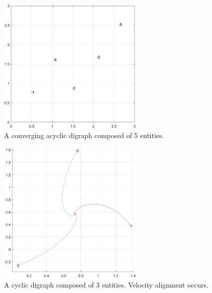 \documentclass[letterpaper, 10 pt, conference]{ieeeconf}  %
\begin{document}
\begin{figure}[thb]
    \begin{center}
    \includegraphics[width=7cm]{IMG/AG_simul3.png}
    \caption{A converging acyclic digraph composed of 5 entities.}
    \label{fig:DAGstate}
    \end{center}
    \vspace{-3mm}
\end{figure}

\begin{figure}[thb]
    \begin{center}
    \includegraphics[width=7cm]{IMG/node3_velo_align_4.png}
    \caption{A cyclic digraph composed of 3 entities. Velocity alignment occurs.}
    \label{fig:velo_align}
    \end{center}
    \vspace{-0mm}
\end{figure}
\end{document}
